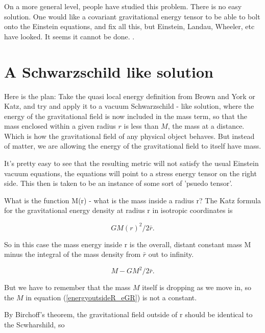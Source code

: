 \documentclass[../rzero]{subfiles}
\begin{document}
On a more general level, people have studied this problem. There is no easy solution. One would like a covariant gravitational energy tensor to be able to bolt onto the Einstein equations, and fix all this, but Einstein, Landau, Wheeler, etc have looked. It seems it cannot be done.  \cite{08092323EnergyMomentumGravitational}. 


\section{A Schwarzschild like solution}
Here is the plan: Take the quasi local energy definition from Brown and York\cite{Brown1993} or Katz\cite{Katz2005}, and try and apply it to a vacuum Schwarzschild - like solution, where the energy of the gravitational field is now included in the mass term, so that the mass enclosed within a given radius $r$ is less than $M$, the mass at a distance. Which is how the gravitational field of any physical object behaves. But instead of matter, we are allowing the energy of the gravitational field to itself have mass. 

It's pretty easy to see that the resulting metric will not satisfy the usual Einstein vacuum equations, the equations will point to a stress energy tensor on the right side. This then is taken to be an instance of some sort of 'psuedo tensor'. 

What is the function M(r) - what is the mass inside a radius r? 
The Katz formula for the gravitational energy density at radius r in isotropic coordinates is 

\begin{equation} \label{energyoutsideR_eGR}
 GM(r)^2/2 \bar r .
\end{equation}

So in this case the mass energy inside r is the overall, distant constant mass M minus the integral of the mass density from $\bar r$ out to infinity. 

\begin{equation} \label{energyinsideR}
 M - GM^2/2 \bar r .
\end{equation}

But we have to remember that the mass $M$ itself is dropping as we move in, so the $M$ in equation (\ref{energyoutsideR_eGR}) is not a constant. 

By Birchoff's theorem, the gravitational field outside of r should be identical to the Scwharshild, so
\end{document}
